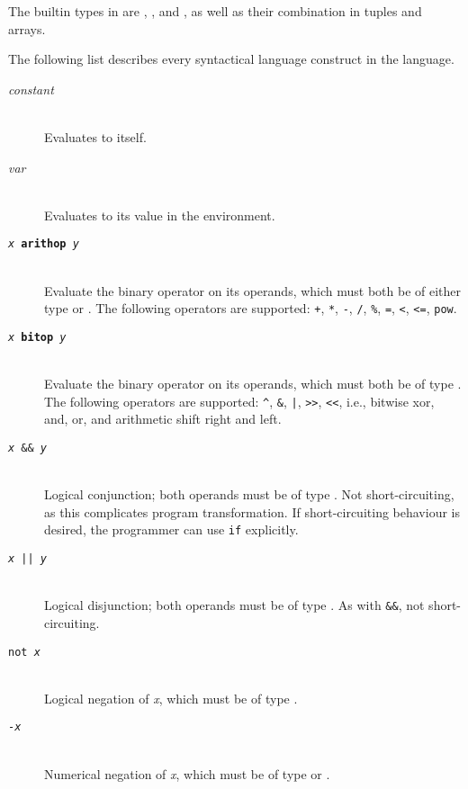 The builtin types in \LO{} are \intt{}, \realt{}, \boolt{} and \chart{}, as
well as their combination in tuples and arrays.

The following list describes every syntactical language construct in
the language.

\begin{description}
  \item[\textit{constant}]\hfill\\
    Evaluates to itself.

  \item[\textit{var}]\hfill\\
    Evaluates to its value in the environment.

  \item[\texttt{\textit{x} \textbf{arithop} \textit{y}}] \hfill\\
    Evaluate the binary operator on its operands, which must both be
    of either type \intt{} or \realt.  The following operators are
    supported: \texttt{+}, \texttt{*}, \texttt{-}, \texttt{/},
    \texttt{\%}, \texttt{=}, \texttt{<}, \texttt{<=}, \texttt{pow}.

  \item[\texttt{\textit{x} \textbf{bitop} \textit{y}}] \hfill\\
    Evaluate the binary operator on its operands, which must both be
    of type \intt.  The following operators are supported:
    \texttt{\^}, \texttt{\&}, \texttt{|}, \texttt{>>}, \texttt{<<},
    i.e., bitwise xor, and, or, and arithmetic shift right and left.

  \item[\texttt{\textit{x} \&\& \textit{y}}]\hfill\\
    Logical conjunction; both operands must be of type \boolt.  Not
    short-circuiting, as this complicates program transformation.  If
    short-circuiting behaviour is desired, the programmer can use
    \texttt{if} explicitly.

  \item[\texttt{\textit{x} || \textit{y}}]\hfill\\
    Logical disjunction; both operands must be of type \boolt.  As
    with \texttt{\&\&}, not short-circuiting.

  \item[\texttt{not \textit{x}}]\hfill\\
    Logical negation of \textit{x}, which must be of type \boolt.

  \item[\texttt{-\textit{x}}]\hfill\\
    Numerical negation of \textit{x}, which must be of type \realt{} or \intt.


\end{description}
